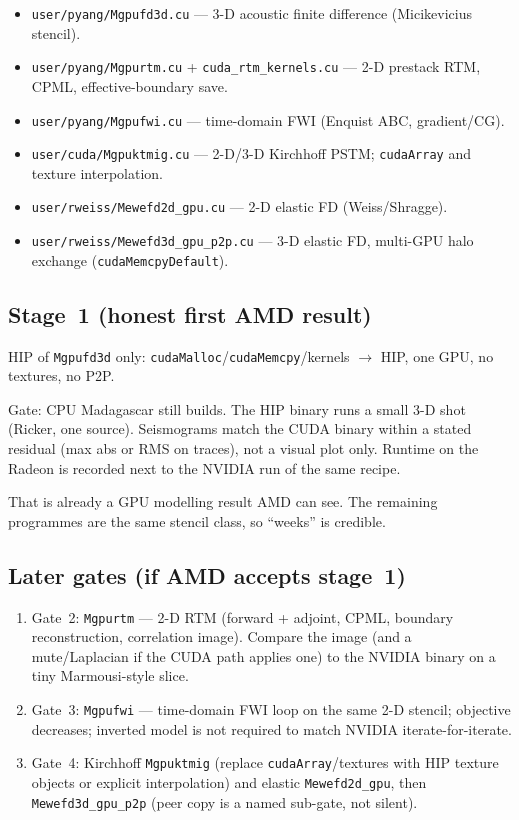 \documentclass[11pt,a4paper]{article}
\begin{document}
\begin{itemize}
\item \texttt{user/pyang/Mgpufd3d.cu} --- 3-D acoustic finite difference (Micikevicius stencil).
\item \texttt{user/pyang/Mgpurtm.cu} + \texttt{cuda\_rtm\_kernels.cu} --- 2-D prestack RTM, CPML, effective-boundary save.
\item \texttt{user/pyang/Mgpufwi.cu} --- time-domain FWI (Enquist ABC, gradient/CG).
\item \texttt{user/cuda/Mgpuktmig.cu} --- 2-D/3-D Kirchhoff PSTM; \texttt{cudaArray} and texture interpolation.
\item \texttt{user/rweiss/Mewefd2d\_gpu.cu} --- 2-D elastic FD (Weiss/Shragge).
\item \texttt{user/rweiss/Mewefd3d\_gpu\_p2p.cu} --- 3-D elastic FD, multi-GPU halo exchange (\texttt{cudaMemcpyDefault}).
\end{itemize}

\subsection*{Stage~1 (honest first AMD result)}

HIP of \texttt{Mgpufd3d} only: \texttt{cudaMalloc}/\texttt{cudaMemcpy}/kernels $\to$ HIP, one GPU, no textures, no P2P.

Gate: CPU Madagascar still builds.
The HIP binary runs a small 3-D shot (Ricker, one source).
Seismograms match the CUDA binary within a stated residual (max abs or RMS on traces), not a visual plot only.
Runtime on the Radeon is recorded next to the NVIDIA run of the same recipe.

That is already a GPU modelling result AMD can see.
The remaining programmes are the same stencil class, so ``weeks'' is credible.

\subsection*{Later gates (if AMD accepts stage~1)}

\begin{enumerate}
\item Gate~2: \texttt{Mgpurtm} --- 2-D RTM (forward + adjoint, CPML, boundary reconstruction, correlation image).
Compare the image (and a mute/Laplacian if the CUDA path applies one) to the NVIDIA binary on a tiny Marmousi-style slice.
\item Gate~3: \texttt{Mgpufwi} --- time-domain FWI loop on the same 2-D stencil; objective decreases; inverted model is not required to match NVIDIA iterate-for-iterate.
\item Gate~4: Kirchhoff \texttt{Mgpuktmig} (replace \texttt{cudaArray}/textures with HIP texture objects or explicit interpolation) and elastic \texttt{Mewefd2d\_gpu}, then \texttt{Mewefd3d\_gpu\_p2p} (peer copy is a named sub-gate, not silent).
\end{enumerate}
\end{document}
